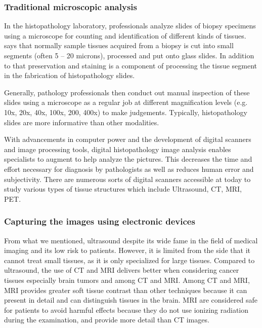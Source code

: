 \subsubsection{Traditional microscopic analysis}
In the histopathology laboratory, professionals analyze slides of biopsy
specimens using a microscope for counting and identification of different
kinds of tissues. says that normally sample tissues acquired from a biopsy
is cut into small segments (often 5 – 20 microns), processed and put onto
glass slides. In addition to that preservation and staining is a component
of processing the tissue segment in the fabrication of histopathology slides.

Generally, pathology professionals then conduct out manual inspection of these slides using a microscope as a regular job at different magnification levels (e.g. 10x, 20x, 40x, 100x, 200, 400x) to make judgements. Typically, histopathology slides are more informative than other modalities.

With advancements in computer power and the development of digital
scanners and image processing tools, digital histopathology image analysis
enables specialists to augment to help analyze the pictures. This decreases
the time and effort necessary for diagnosis by pathologists as well as reduces
human error and subjectivity. There are numerous sorts of digital scanners
accessible at today to study various types of tissue structures which include
Ultrasound, CT, MRI, PET.
\subsubsection{Capturing the images using electronic devices}
From what we mentioned, ultrasound despite its wide fame in the field
of medical imaging and its low risk to patients. However, it is limited from
the side that it cannot treat small tissues, as it is only specialized for large
tissues. Compared to ultrasound, the use of CT and MRI delivers better
when considering cancer tissues especially brain tumors and among CT
and MRI. Among CT and MRI, MRI provides greater soft tissue contrast
than other techniques because it can present in detail and can distinguish
tissues in the brain. MRI are considered safe for patients to avoid harmful
effects because they do not use ionizing radiation during the examination,
and provide more detail than CT images.

